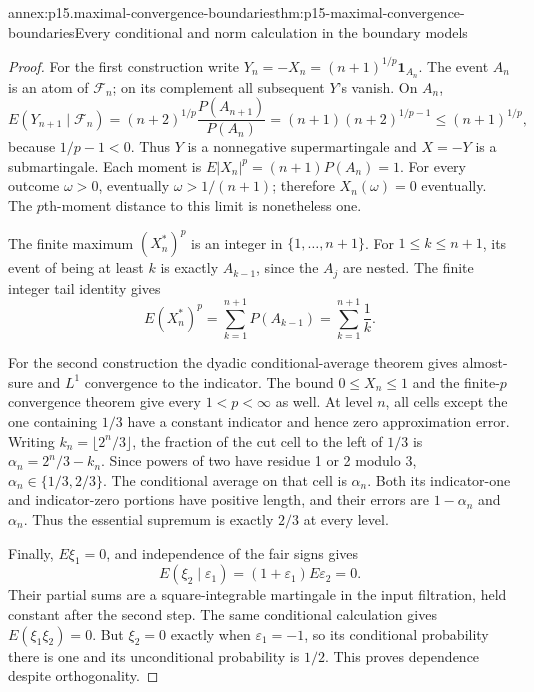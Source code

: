 \begin{annexitem}{annex:p15.maximal-convergence-boundaries}{thm:p15-maximal-convergence-boundaries}{Every conditional and norm calculation in the boundary models}
\begin{proof}
For the first construction write
\(Y_n=-X_n=(n+1)^{1/p}\mathbf1_{A_n}\).
The event \(A_n\) is an atom of \(\mathcal F_n\);
on its complement all subsequent \(Y\)'s vanish.
On \(A_n\),
\[
 E(Y_{n+1}\mid\mathcal F_n)
        =(n+2)^{1/p}\frac{P(A_{n+1})}{P(A_n)}
        =(n+1)(n+2)^{1/p-1}
        \leq(n+1)^{1/p},
\]
because \(1/p-1<0\).
Thus \(Y\) is a nonnegative supermartingale and \(X=-Y\)
is a submartingale. Each moment is
\(E|X_n|^p=(n+1)P(A_n)=1\).
For every outcome \(\omega>0\), eventually \(\omega>1/(n+1)\);
therefore \(X_n(\omega)=0\) eventually.
The \(p\)th-moment distance to this limit is nonetheless one.

The finite maximum \((X_n^*)^p\) is an integer in
\(\{1,\ldots,n+1\}\).
For \(1\leq k\leq n+1\), its event of being at least \(k\)
is exactly \(A_{k-1}\), since the \(A_j\) are nested.
The finite integer tail identity gives
\[
                         E(X_n^*)^p=\sum_{k=1}^{n+1}P(A_{k-1})
                                             =\sum_{k=1}^{n+1}\frac1k.
\]

For the second construction the dyadic conditional-average theorem
gives almost-sure and \(L^1\) convergence to the indicator.
The bound \(0\leq X_n\leq1\) and the finite-\(p\) convergence
theorem give every \(1<p<\infty\) as well.
At level \(n\), all cells except the one containing \(1/3\)
have a constant indicator and hence zero approximation error.
Writing \(k_n=\lfloor2^n/3\rfloor\), the fraction of the cut
cell to the left of \(1/3\) is
\(\alpha_n=2^n/3-k_n\).
Since powers of two have residue 1 or 2 modulo 3,
\(\alpha_n\in\{1/3,2/3\}\).
The conditional average on that cell is \(\alpha_n\).
Both its indicator-one and indicator-zero portions have positive
length, and their errors are \(1-\alpha_n\) and \(\alpha_n\).
Thus the essential supremum is exactly \(2/3\) at every level.

Finally, \(E\xi_1=0\), and independence of the fair signs gives
\[
                   E(\xi_2\mid\varepsilon_1)
                           =(1+\varepsilon_1)E\varepsilon_2=0.
\]
Their partial sums are a square-integrable martingale in the
input filtration, held constant after the second step.
The same conditional calculation gives
\(E(\xi_1\xi_2)=0\).
But \(\xi_2=0\) exactly when \(\varepsilon_1=-1\), so its
conditional probability there is one and its unconditional
probability is \(1/2\). This proves dependence despite orthogonality.
\end{proof}
\end{annexitem}

